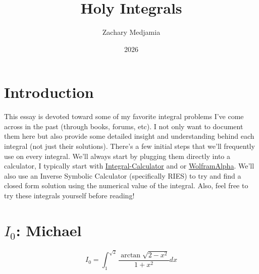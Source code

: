 \documentclass{article}
\title{Holy Integrals}
\author{Zachary Medjamia}
\date{2026}
\begin{document}
\maketitle

\section*{Introduction}

This essay is devoted toward some of my favorite integral problems I've come across in the past (through books, forums, etc). I not only want to document them here but also provide some detailed insight and understanding behind each integral (not just their solutions). There's a few initial steps that we'll frequently use on every integral. We'll always start by plugging them directly into a calculator, I typically start with \href{https://www.integral-calculator.com/}{Integral-Calculator} and or \href{https://www.wolframalpha.com/}{WolframAlpha}. We'll also use an Inverse Symbolic Calculator (specifically RIES) to try and find a closed form solution using the numerical value of the integral. Also, feel free to try these integrals yourself before reading!

\section{$I_{0}$: Michael}
$$I_{0} = \int_{1}^{\sqrt{2}}{\frac{\arctan{\sqrt{2 - x^2}}}{1+x^2}dx}$$

\begin{center}
\end{center}
\end{document}
